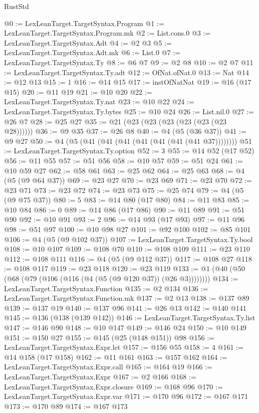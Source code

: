 \begin{lexlean}{RustStd}
\begin{coremodule}
@0 := LexLeanTarget.TargetSyntax.Program
@1 := LexLeanTarget.TargetSyntax.Program.mk
@2 := List.cons.{0}
@3 := LexLeanTarget.TargetSyntax.Adt
@4 := @2 @3
@5 := LexLeanTarget.TargetSyntax.Adt.mk
@6 := List.{0}
@7 := LexLeanTarget.TargetSyntax.Ty
@8 := @6 @7
@9 := @2 @8
@10 := @2 @7
@11 := LexLeanTarget.TargetSyntax.Ty.adt
@12 := OfNat.ofNat.{0}
@13 := Nat
@14 := @12 @13
@15 := 1
@16 := @14 @15
@17 := instOfNatNat
@19 := @16 (@17 @15)
@20 := @11 @19
@21 := @10 @20
@22 := LexLeanTarget.TargetSyntax.Ty.nat
@23 := @10 @22
@24 := LexLeanTarget.TargetSyntax.Ty.bytes
@25 := @10 @24
@26 := List.nil.{0}
@27 := @26 @7
@28 := @25 @27
@35 := @21 (@23 (@23 (@23 (@23 (@23 (@23 @28))))))
@36 := @9 @35
@37 := @26 @8
@40 := @4 (@5 (@36 @37))
@41 := @9 @27
@50 := @4 (@5 (@41 (@41 (@41 (@41 (@41 (@41 (@41 @37))))))))
@51 := LexLeanTarget.TargetSyntax.Ty.option
@52 := 3
@55 := @14 @52 (@17 @52)
@56 := @11 @55
@57 := @51 @56
@58 := @10 @57
@59 := @51 @24
@61 := @10 @59 @27
@62 := @58 @61
@63 := @25 @62
@64 := @25 @63
@68 := @4 (@5 (@9 @64 @37))
@69 := @23 @27
@70 := @23 @69
@71 := @23 @70
@72 := @23 @71
@73 := @23 @72
@74 := @23 @73
@75 := @25 @74
@79 := @4 (@5 (@9 @75 @37))
@80 := 5
@83 := @14 @80 (@17 @80)
@84 := @11 @83
@85 := @10 @84
@86 := 0
@89 := @14 @86 (@17 @86)
@90 := @11 @89
@91 := @51 @90
@92 := @10 @91
@93 := 2
@96 := @14 @93 (@17 @93)
@97 := @11 @96
@98 := @51 @97
@100 := @10 @98 @27
@101 := @92 @100
@102 := @85 @101
@106 := @4 (@5 (@9 @102 @37))
@107 := LexLeanTarget.TargetSyntax.Ty.bool
@108 := @10 @107
@109 := @108 @70
@110 := @108 @109
@111 := @23 @110
@112 := @108 @111
@116 := @4 (@5 (@9 @112 @37))
@117 := @108 @27
@118 := @108 @117
@119 := @23 @118
@120 := @23 @119
@133 := @1 (@40 (@50 (@68 (@79 (@106 (@116 (@4 (@5 (@9 @120 @37)) (@26 @3))))))))
@134 := LexLeanTarget.TargetSyntax.Function
@135 := @2 @134
@136 := LexLeanTarget.TargetSyntax.Function.mk
@137 := @2 @13
@138 := @137 @89
@139 := @137 @19
@140 := @137 @96
@141 := @26 @13
@142 := @140 @141
@145 := @136 (@138 (@139 @142))
@146 := LexLeanTarget.TargetSyntax.Ty.list
@147 := @146 @90
@148 := @10 @147
@149 := @146 @24
@150 := @10 @149
@151 := @150 @27
@155 := @145 (@25 (@148 @151)) @98
@156 := LexLeanTarget.TargetSyntax.Expr.let
@157 := @156 @55
@158 := 4
@161 := @14 @158 (@17 @158)
@162 := @11 @161
@163 := @157 @162
@164 := LexLeanTarget.TargetSyntax.Expr.call
@165 := @164 @19
@166 := LexLeanTarget.TargetSyntax.Expr
@167 := @2 @166
@168 := LexLeanTarget.TargetSyntax.Expr.closure
@169 := @168 @96
@170 := LexLeanTarget.TargetSyntax.Expr.var
@171 := @170 @96
@172 := @167 @171
@173 := @170 @89
@174 := @167 @173

\end{coremodule}
\end{lexlean}
